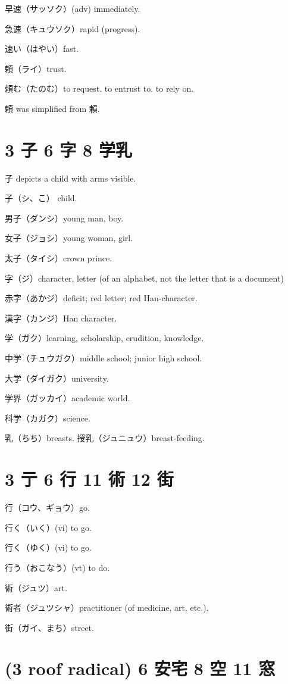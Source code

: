 早速（サッソク）(adv) immediately.

急速（キュウソク）rapid (progress).

速い（はやい）fast.

頼（ライ）trust.

頼む（たのむ）to request. to entrust to. to rely on.

頼 was simplified from 賴.

\section{3 子 6 字 8 学乳}

子 depicts a child with arms visible.

子（シ、こ） child.

男子（ダンシ）young man, boy.

女子（ジョシ）young woman, girl.

太子（タイシ）crown prince.

字（ジ）character, letter (of an alphabet, not the letter that is a document)

赤字（あかジ）deficit; red letter; red Han-character.

漢字（カンジ）Han character.

学（ガク）learning, scholarship, erudition, knowledge.

中学（チュウガク）middle school; junior high school.

大学（ダイガク）university.

学界（ガッカイ）academic world.

科学（カガク）science.

乳（ちち）breasts.
授乳（ジュニュウ）breast-feeding.

\section{3 亍 6 行 11 術 12 街}

行（コウ、ギョウ）go.

行く（いく）(vi) to go.

行く（ゆく）(vi) to go.

行う（おこなう）(vt) to do.

術（ジュツ）art.

術者（ジュツシャ）practitioner (of medicine, art, etc.).

街（ガイ、まち）street.

\section{(3 roof radical) 6 安宅 8 空 11 窓}

